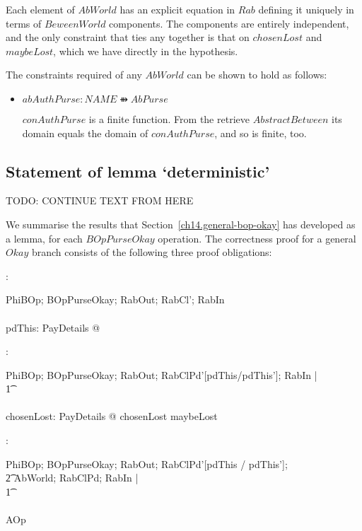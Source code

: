Each element of $AbWorld$ has an explicit equation in
$Rab$ defining it uniquely in terms of $BeweenWorld$ components.
The components are entirely independent, and the only constraint
that ties any together is that on $chosenLost$ and $maybeLost$,
which we have directly in the hypothesis.

The constraints required of any $AbWorld$ can be shown to hold as
follows:
\begin{itemize}
\item $abAuthPurse : NAME \ffun AbPurse$

  $conAuthPurse$ is a finite function.  From the retrieve
  $AbstractBetween$ its domain equals the
  domain of $conAuthPurse$, and so is finite, too.
\end{itemize}

\subsection{Statement of lemma `deterministic'}\label{ch14.general-summary}

TODO: CONTINUE TEXT FROM HERE

We summarise the results that Section~\ref{ch14.general-bop-okay} has
developed as a lemma, for each $BOpPurseOkay$ operation.
  {\rm The correctness proof for a general $Okay$ branch consists of
    the following three proof obligations:}

  :
  \begin{gzed}
    PhiBOp; BOpPurseOkay; RabOut; RabCl'; RabIn
    \\ %
    \shows
    \\ %
    \exists pdThis: PayDetails @ \pdThisPred
  \end{gzed}

  :
  \begin{gzed}
    PhiBOp; BOpPurseOkay; RabOut; RabClPd'[pdThis/pdThis']; RabIn |
    \\ %
    \t1 \pdThisPred
    \\ %
    \shows
    \\ %
    \exists chosenLost: \power PayDetails @ \chosenLostPred \land
    chosenLost \subseteq maybeLost
  \end{gzed}

  :
  \begin{gzed}
    PhiBOp; BOpPurseOkay; RabOut; RabClPd'[pdThis / pdThis'];
    \\ %
    \t2 AbWorld; RabClPd; RabIn |
    \\ %
    \t1 \pdThisPred \land \chosenLostPred
    \\ %
    \shows
    \\ %
    AOp
  \end{gzed}

